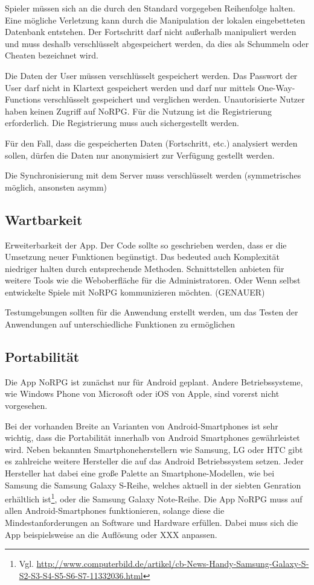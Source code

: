{		Spieler müssen sich an die durch den Standard vorgegeben Reihenfolge halten. Eine mögliche Verletzung kann durch die Manipulation der lokalen eingebetteten Datenbank entstehen. Der Fortschritt darf nicht außerhalb manipuliert werden und muss deshalb verschlüsselt abgespeichert werden, da dies als Schummeln oder Cheaten bezeichnet wird.
		
		Die Daten der User müssen verschlüsselt gespeichert werden. Das Passwort der User darf nicht in Klartext gespeichert werden und darf nur mittels One-Way-Functions verschlüsselt gespeichert und verglichen werden. Unautorisierte Nutzer haben keinen Zugriff auf NoRPG. Für die Nutzung ist die Registrierung erforderlich. Die Registrierung muss auch sichergestellt werden.
		
		Für den Fall, dass die gespeicherten Daten (Fortschritt, etc.) analysiert werden sollen, dürfen die Daten nur anonymisiert zur Verfügung gestellt werden.
		
		Die Synchronisierung mit dem Server muss verschlüsselt werden (symmetrisches möglich, ansonsten asymm) 
	
	\subsection{Wartbarkeit}
		Erweiterbarkeit der App. Der Code sollte so geschrieben werden, dass er die Umsetzung neuer Funktionen begünstigt. Das bedeuted auch Komplexität niedriger halten durch entsprechende Methoden. Schnittstellen anbieten für weitere Tools wie die Weboberfläche für die Administratoren. Oder Wenn selbst entwickelte Spiele mit NoRPG kommunizieren möchten. (GENAUER)
		
		Testumgebungen sollten für die Anwendung erstellt werden, um das Testen der Anwendungen auf unterschiedliche Funktionen zu ermöglichen
	
	\subsection{Portabilität}
		Die App NoRPG ist zunächst nur für Android geplant. Andere Betriebssysteme, wie Windows Phone von Microsoft oder iOS von Apple, sind vorerst nicht vorgesehen. 
		
		Bei der vorhanden Breite an Varianten von Android-Smartphones ist sehr wichtig, dass die Portabilität innerhalb von Android Smartphones gewährleistet wird. Neben bekannten Smartphoneherstellern wie Samsung, LG oder HTC gibt es zahlreiche weitere Hersteller die auf das Android Betriebssystem setzen. Jeder Hersteller hat dabei eine große Palette an Smartphone-Modellen, wie bei Samsung die Samsung Galaxy S-Reihe, welches aktuell in der siebten Genration erhältlich ist\footnote{Vgl. \url{http://www.computerbild.de/artikel/cb-News-Handy-Samsung-Galaxy-S-S2-S3-S4-S5-S6-S7-11332036.html}}, oder die Samsung Galaxy Note-Reihe. Die App NoRPG muss auf allen Android-Smartphones funktionieren, solange diese die Mindestanforderungen an Software und Hardware erfüllen. Dabei muss sich die App beispielsweise an die Auflösung oder XXX anpassen.
		
}
